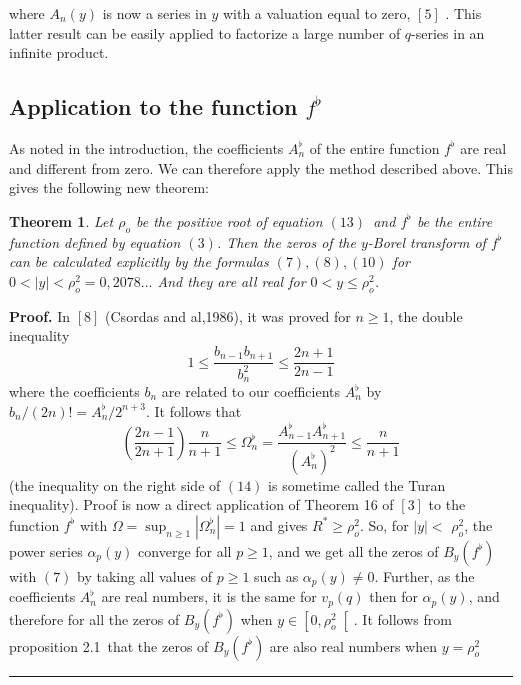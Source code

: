 \documentclass{article}
\newtheorem{theorem}{Theorem}[section]
\newenvironment{proof}[1][Proof]{\textbf{#1.} }{\ \rule{0.5em}{0.5em}}
\begin{document}
where $A_{n}\left( y\right) $ is now a series in $y$ with a valuation equal
to zero, $\left[ 5\right] $ . This latter result can be easily applied to
factorize a large number of $q$-series in an infinite product.

\subsection{Application to the function $f^{\flat }$}

As noted in the introduction, the coefficients $A_{n}^{\flat }$ of the
entire function $f^{\flat }$ are real and different from zero. We can
therefore apply the method described above. This gives the following new
theorem:

\begin{theorem}
\bigskip Let $\rho _{o}$ be the positive root of equation $\left( 13\right) $\ and $f^{\flat }$ be the entire function defined by equation $\left(
3\right) $. Then the zeros of the $y$-Borel transform of $f^{\flat }$can be
calculated explicitly by the formulas $\left( 7\right) ,\left( 8\right)
,\left( 10\right) $ for $0<\left| y\right| <\rho _{o}^{2}=0,2078...$ And
they are all real for $0<y\leq \rho _{o}^{2}$.
\end{theorem}

\begin{proof}
\bigskip In $\left[ 8\right] $ (Csordas and al,1986), it was proved for $n\geq 1$, the double inequality 
\begin{equation*}
1\leq \dfrac{b_{n-1}b_{n+1}}{b_{n}^{2}}\leq \dfrac{2n+1}{2n-1}
\end{equation*}
where the coefficients $b_{n}$ are related to our coefficients $A_{n}^{\flat
}$ by $b_{n}/(2n)!=A_{n}^{\flat }/2^{n+3}$. It follows that 
\begin{equation}
\left( \dfrac{2n-1}{2n+1}\right) \dfrac{n}{n+1}\leq \Omega _{n}^{\flat }=\dfrac{A_{n-1}^{\flat }A_{n+1}^{\flat }}{\left( A_{n}^{\flat }\right) ^{2}}\leq \dfrac{n}{n+1}
\end{equation}
(the inequality on the right side of $\left( 14\right) $ is sometime called
the Turan inequality). Proof is now a direct application of Theorem 16 of $\left[ 3\right] $ to the function $f^{\flat }$ with $\Omega =\sup_{n\geq
1}\left| \Omega _{n}^{\flat }\right| =1$ and gives $R^{\ast }\geq \rho
_{o}^{2}$. So, for $\left| y\right| <$ $\rho _{o}^{2}$, the power series $\alpha _{p}\left( y\right) $ converge for all $p\geq 1$, and we get all the
zeros of $B_{y}\left( f^{\flat }\right) $ with $\left( 7\right) $ by taking
all values of $p\geq 1$ such as $\alpha _{p}\left( y\right) \neq 0$.
Further, as the coefficients $A_{n}^{\flat }$ are real numbers, it is the
same for $v_{p}\left( q\right) $ then for $\alpha _{p}\left( y\right) $, and
therefore for all the zeros of $B_{y}\left( f^{\flat }\right) $ when $y\in \left[ 0,\rho _{o}^{2}\right[ $. It follows from proposition 2.1\ that the
zeros of $B_{y}\left( f^{\flat }\right) $ are also real numbers when $y=\rho
_{o}^{2}$
\end{proof}
\end{document}
